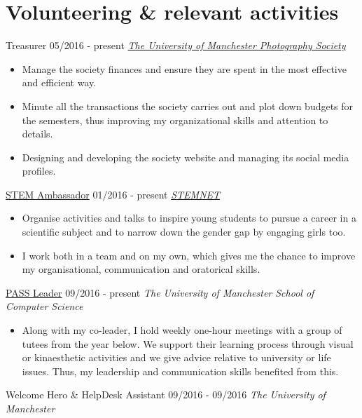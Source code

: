 \documentclass[]{friggeri-cv}
\begin{document}
\section{\color{red}Volunteering \color{gray} \& relevant activities}
\begin{entrylist}
  \entry
    {}
    {Treasurer}
    {05/2016 - present}
    {\emph{\href{https://www.facebook.com/UoMPhotoSoc/}{The University of Manchester Photography Society}}}
    \begin{itemize}
        \item Manage the society finances and ensure they are spent in the most effective and efficient way.
        \item Minute all the transactions the society carries out and plot down budgets for the semesters, thus improving my organizational skills and attention to details.
        \item Designing and developing the society website and managing its social media profiles. \\
    \end{itemize}
  \entry
    {}
    {\href{http://www.stemnet.org.uk/ambassadors/}{STEM Ambassador}}
    {01/2016 - present}
    {\emph{\href{http://www.stemnet.org.uk/}{STEMNET}}}
    \begin{itemize}
        \item Organise activities and talks to inspire young students to pursue a career in a scientific subject and to narrow down the gender gap by engaging girls too.
        \item I work both in a team and on my own, which gives me the chance to improve my organisational, communication and oratorical skills.\\
    \end{itemize}
  \entry
    {}
    {\href{http://www.pass.manchester.ac.uk/}{PASS Leader}}
    {09/2016 - present}
    {\emph{The University of Manchester School of Computer Science}}
    \begin{itemize}
        \item Along with my co-leader, I hold weekly one-hour meetings with a group of tutees from the year below. We support their learning process through visual or kinaesthetic activities and we give advice relative to university or life issues. Thus, my leadership and communication skills benefited from this.\\
    \end{itemize}
  \entry
    {}
    {Welcome Hero \& HelpDesk Assistant}
    {09/2016 - 09/2016}
    {\emph{The University of Manchester}}

\end{entrylist}
\end{document}
